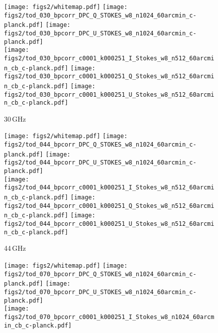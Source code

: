 \documentclass[twocolumn]{aa}
\newcommand{\?}[1]{\textcolor{red}{{\bf [#1]}}}
\begin{document}
  \begin{figure*}[p] %
    \center
    \begin{subfigure}[t]{\linewidth}
      \texttt{[image: figs2/whitemap.pdf]}
      \texttt{[image: figs2/tod\_030\_bpcorr\_DPC\_Q\_STOKES\_w8\_n1024\_60arcmin\_c-planck.pdf]}
      \texttt{[image: figs2/tod\_030\_bpcorr\_DPC\_U\_STOKES\_w8\_n1024\_60arcmin\_c-planck.pdf]}\\
      \texttt{[image: figs2/tod\_030\_bpcorr\_c0001\_k000251\_I\_Stokes\_w8\_n512\_60arcmin\_cb\_c-planck.pdf]}
      \texttt{[image: figs2/tod\_030\_bpcorr\_c0001\_k000251\_Q\_Stokes\_w8\_n512\_60arcmin\_cb\_c-planck.pdf]}
      \texttt{[image: figs2/tod\_030\_bpcorr\_c0001\_k000251\_U\_Stokes\_w8\_n512\_60arcmin\_cb\_c-planck.pdf]}
      \caption{30\,GHz}
      \vspace*{3mm}
    \end{subfigure}
    \begin{subfigure}[t]{\linewidth}
      \texttt{[image: figs2/whitemap.pdf]}
      \texttt{[image: figs2/tod\_044\_bpcorr\_DPC\_Q\_STOKES\_w8\_n1024\_60arcmin\_c-planck.pdf]}
      \texttt{[image: figs2/tod\_044\_bpcorr\_DPC\_U\_STOKES\_w8\_n1024\_60arcmin\_c-planck.pdf]}\\
      \texttt{[image: figs2/tod\_044\_bpcorr\_c0001\_k000251\_I\_Stokes\_w8\_n512\_60arcmin\_cb\_c-planck.pdf]}
      \texttt{[image: figs2/tod\_044\_bpcorr\_c0001\_k000251\_Q\_Stokes\_w8\_n512\_60arcmin\_cb\_c-planck.pdf]}
      \texttt{[image: figs2/tod\_044\_bpcorr\_c0001\_k000251\_U\_Stokes\_w8\_n512\_60arcmin\_cb\_c-planck.pdf]}
      \caption{44\,GHz}
      \vspace*{3mm}
    \end{subfigure}
    \begin{subfigure}[t]{\linewidth}
      \texttt{[image: figs2/whitemap.pdf]}
      \texttt{[image: figs2/tod\_070\_bpcorr\_DPC\_Q\_STOKES\_w8\_n1024\_60arcmin\_c-planck.pdf]}
      \texttt{[image: figs2/tod\_070\_bpcorr\_DPC\_U\_STOKES\_w8\_n1024\_60arcmin\_c-planck.pdf]}\\
      \texttt{[image: figs2/tod\_070\_bpcorr\_c0001\_k000251\_I\_Stokes\_w8\_n1024\_60arcmin\_cb\_c-planck.pdf]}

\end{subfigure}
\end{figure*}
\end{document}
